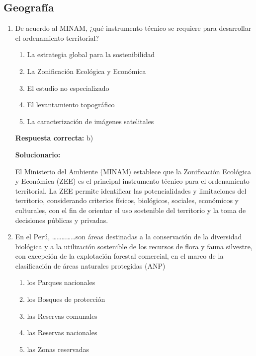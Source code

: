 \subsection*{Geografía}

\begin{enumerate}[resume]

	\item De acuerdo al MINAM, ¿qué instrumento técnico se requiere para desarrollar el ordenamiento territorial?

	\begin{enumerate}[label=\alph*)]
		\item La estrategia global para la sostenibilidad
		\item La Zonificación Ecológica y Económica
		\item El estudio no especializado
		\item El levantamiento topográfico
		\item La caracterización de imágenes satelitales
	\end{enumerate}

	\textbf{Respuesta correcta:} b)

	\vspace{2mm}
	\textbf{Solucionario:}

	El Ministerio del Ambiente (MINAM) establece que la Zonificación Ecológica y Económica (ZEE) es el principal instrumento técnico para el ordenamiento territorial.
	La ZEE permite identificar las potencialidades y limitaciones del territorio, considerando criterios físicos, biológicos, sociales, económicos y culturales, con el fin de orientar el uso sostenible del territorio y la toma de decisiones públicas y privadas.

	\vspace{6mm}

	\item En el Perú, \dots\dots\dots\dots\dots son áreas destinadas a la conservación de la diversidad biológica y a la utilización sostenible de los recursos de flora y fauna silvestre, con excepción de la explotación forestal comercial, en el marco de la clasificación de áreas naturales protegidas (ANP)
	\begin{enumerate}[label=\alph*)]
		\item los Parques nacionales
		\item los Bosques de protección
		\item las Reservas comunales
		\item las Reservas nacionales
		\item las Zonas reservadas
	\end{enumerate}


\end{enumerate}
